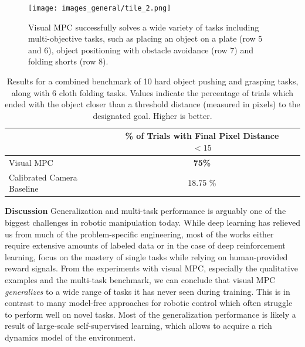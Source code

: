\begin{figure}
	\centering
	\texttt{[image: images\_general/tile\_2.png]}
	\caption{Visual MPC successfully solves a wide variety of tasks including multi-objective tasks, such as placing an object on a plate (row 5 and 6), object positioning with obstacle avoidance (row 7) and folding shorts (row 8).   
		\label{fig:tile_2}}
\end{figure}

\label{subsec:cloth_folding_data}
\begin{table}
\centering
{\footnotesize
\begin{tabular}{lcc}
	\toprule
         &  \thead{\% of Trials with \\ Final Pixel Distance $< 15$}   \\
         \midrule
  Visual MPC & \textbf{75\%} \\ 
  Calibrated Camera Baseline & 18.75 \% \\
  \bottomrule
\end{tabular}
}
\caption{Results for a combined benchmark of 10 hard object pushing and grasping tasks, along with 6 cloth folding tasks. Values indicate the percentage of trials which ended with the object closer than a threshold distance (measured in pixels) to the designated goal. Higher is better.} 
\label{table:cloth_folding}
\end{table}

\noindent \textbf{Discussion}
Generalization and multi-task performance is arguably one of the biggest challenges in robotic manipulation today. While deep learning has relieved us from much of the problem-specific engineering, most of the works either require extensive amounts of labeled data or in the case of deep reinforcement learning, focus on the mastery of single tasks while relying on human-provided reward signals. 
From the experiments with visual MPC, especially the qualitative examples and the multi-task benchmark, we can conclude that visual MPC \emph{generalizes} to a wide range of tasks it has never seen during training. This is in contrast to many model-free approaches for robotic control which often struggle to perform well on novel tasks. Most of the generalization performance is likely a result of large-scale self-supervised learning, which allows to acquire a rich dynamics model of the environment. 
